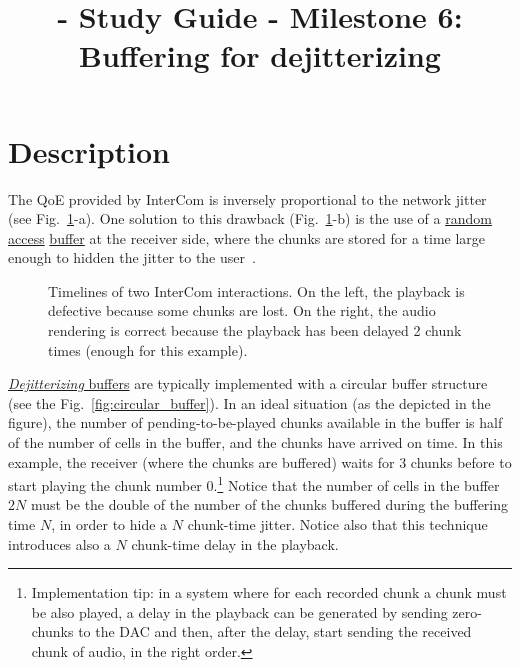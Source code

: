 
\title{\TM - Study Guide - Milestone 6: Buffering for dejitterizing}

\maketitle

\section{Description}

The QoE provided by InterCom is inversely proportional to the network
jitter (see Fig.~\ref{fig:timelines}-a). One solution to this drawback
(Fig.~\ref{fig:timelines}-b) is the use of a
\href{https://en.wikipedia.org/wiki/Random_access}{random access}
\href{https://en.wikipedia.org/wiki/Data_buffer}{buffer} at the
receiver side, where the chunks are stored for a time large enough to
hidden the jitter to the user~\cite{Kurose-Ross}.

\begin{figure}
  \begin{center}
  \end{center}
  \caption{Timelines of two InterCom interactions. On the left, the
    playback is defective because some chunks are lost. On the right,
    the audio rendering is correct because the playback has been
    delayed 2 chunk times (enough for this example).}
  \label{fig:timelines}
\end{figure}

\href{https://en.wikipedia.org/wiki/Jitter#Jitter_buffers}{\emph{Dejitterizing}
  buffers} are typically implemented with a circular buffer structure
(see the Fig.~\ref{fig:circular_buffer}). In an ideal situation (as
the depicted in the figure), the number of pending-to-be-played chunks
available in the buffer is half of the number of cells in the buffer,
and the chunks have arrived on time. In this example, the receiver
(where the chunks are buffered) waits for 3 chunks before to start
playing the chunk number 0.\footnote{Implementation tip: in a system
  where for each recorded chunk a chunk must be also played, a delay
  in the playback can be generated by sending zero-chunks to the DAC
  and then, after the delay, start sending the received chunk of
  audio, in the right order.} Notice that the number of cells in the
buffer $2N$ must be the double of the number of the chunks buffered
during the buffering time $N$, in order to hide a $N$ chunk-time
jitter. Notice also that this technique introduces also a $N$
chunk-time delay in the playback.

